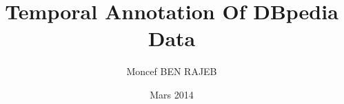 \documentclass[12pt,a4paper,oneside]{book}
\begin{document}
 
\author{Moncef BEN RAJEB} 
\title{Temporal Annotation Of DBpedia Data} 
\date{Mars 2014} 
\frontmatter 




\end{document}
